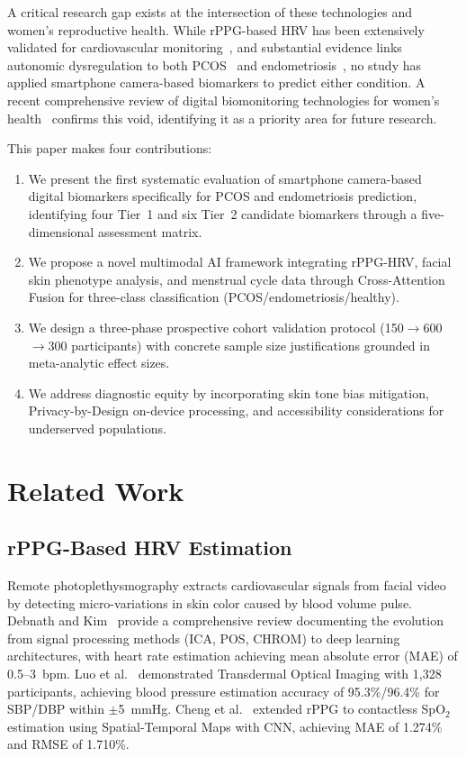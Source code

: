 \documentclass[conference]{IEEEtran}
\begin{document}
A critical research gap exists at the intersection of these technologies and women's reproductive health. While rPPG-based HRV has been extensively validated for cardiovascular monitoring~\cite{debnath2025comprehensive, luo2019smartphone}, and substantial evidence links autonomic dysregulation to both PCOS~\cite{Mirzohreh_2024} and endometriosis~\cite{Hao_2021, Moreira_2021}, no study has applied smartphone camera-based biomarkers to predict either condition. A recent comprehensive review of digital biomonitoring technologies for women's health~\cite{Moghimikandelousi_2025} confirms this void, identifying it as a priority area for future research.

This paper makes four contributions:
\begin{enumerate}
\item We present the first systematic evaluation of smartphone camera-based digital biomarkers specifically for PCOS and endometriosis prediction, identifying four Tier~1 and six Tier~2 candidate biomarkers through a five-dimensional assessment matrix.
\item We propose a novel multimodal AI framework integrating rPPG-HRV, facial skin phenotype analysis, and menstrual cycle data through Cross-Attention Fusion for three-class classification (PCOS/endometriosis/healthy).
\item We design a three-phase prospective cohort validation protocol (150$\rightarrow$600$\rightarrow$300 participants) with concrete sample size justifications grounded in meta-analytic effect sizes.
\item We address diagnostic equity by incorporating skin tone bias mitigation, Privacy-by-Design on-device processing, and accessibility considerations for underserved populations.
\end{enumerate}

\section{Related Work}

\subsection{rPPG-Based HRV Estimation}

Remote photoplethysmography extracts cardiovascular signals from facial video by detecting micro-variations in skin color caused by blood volume pulse. Debnath and Kim~\cite{debnath2025comprehensive} provide a comprehensive review documenting the evolution from signal processing methods (ICA, POS, CHROM) to deep learning architectures, with heart rate estimation achieving mean absolute error (MAE) of 0.5--3~bpm. Luo et al.~\cite{luo2019smartphone} demonstrated Transdermal Optical Imaging with 1,328 participants, achieving blood pressure estimation accuracy of 95.3\%/96.4\% for SBP/DBP within $\pm$5~mmHg. Cheng et al.~\cite{Cheng_2024} extended rPPG to contactless SpO$_2$ estimation using Spatial-Temporal Maps with CNN, achieving MAE of 1.274\% and RMSE of 1.710\%.
\end{document}
